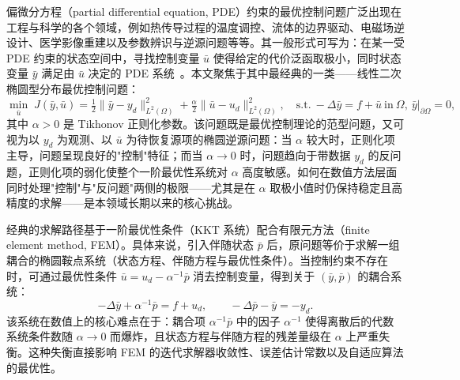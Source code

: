 \documentclass{xmu}
\theoremstyle{plain}
\theoremstyle{remark}
\begin{document}

\tableofcontents




\label{sec:intro}

\label{subsec:intro-background}

偏微分方程（partial differential equation, PDE）约束的最优控制问题广泛出现在工程与科学的各个领域，例如热传导过程的温度调控、流体的边界驱动、电磁场逆设计、医学影像重建以及参数辨识与逆源问题等等。其一般形式可写为：在某一受 PDE 约束的状态空间中，寻找控制变量 $\bar u$ 使得给定的代价泛函取极小，同时状态变量 $\bar y$ 满足由 $\bar u$ 决定的 PDE 系统~\cite{1}。本文聚焦于其中最经典的一类——线性二次椭圆型分布最优控制问题：
\begin{equation*}
\min_{\bar u}\; J(\bar y, \bar u) = \tfrac{1}{2}\|\bar y - y_d\|^2_{L^2(\Omega)} + \tfrac{\alpha}{2}\|\bar u - u_d\|^2_{L^2(\Omega)},
\quad\text{s.t.}\ -\Delta\bar y = f + \bar u\ \text{in}\ \Omega,\ \bar y|_{\partial\Omega} = 0,
\end{equation*}
其中 $\alpha>0$ 是 Tikhonov 正则化参数。该问题既是最优控制理论的范型问题，又可视为以 $y_d$ 为观测、以 $\bar u$ 为待恢复源项的椭圆逆源问题：当 $\alpha$ 较大时，正则化项主导，问题呈现良好的"控制"特征；而当 $\alpha\to 0$ 时，问题趋向于带数据 $y_d$ 的反问题，正则化项的弱化使整个一阶最优性系统对 $\alpha$ 高度敏感。如何在数值方法层面同时处理"控制"与"反问题"两侧的极限——尤其是在 $\alpha$ 取极小值时仍保持稳定且高精度的求解——是本领域长期以来的核心挑战。

\label{subsec:intro-classical}

经典的求解路径基于一阶最优性条件（KKT 系统）配合有限元方法（finite element method, FEM）。具体来说，引入伴随状态 $\bar p$ 后，原问题等价于求解一组耦合的椭圆鞍点系统（状态方程、伴随方程与最优性条件）。当控制约束不存在时，可通过最优性条件 $\bar u = u_d - \alpha^{-1}\bar p$ 消去控制变量，得到关于 $(\bar y, \bar p)$ 的耦合系统：
\begin{equation*}
-\Delta\bar y + \alpha^{-1}\bar p = f + u_d,\qquad
-\Delta\bar p - \bar y = -y_d.
\end{equation*}
该系统在数值上的核心难点在于：耦合项 $\alpha^{-1}\bar p$ 中的因子 $\alpha^{-1}$ 使得离散后的代数系统条件数随 $\alpha\to 0$ 而爆炸，且状态方程与伴随方程的残差量级在 $\alpha$ 上严重失衡。这种失衡直接影响 FEM 的迭代求解器收敛性、误差估计常数以及自适应算法的最优性。
\end{document}
